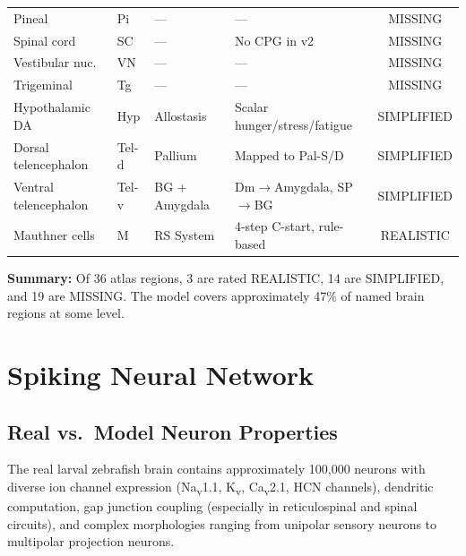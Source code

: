 \documentclass[11pt,a4paper]{article}
\begin{document}
\begin{longtable}{@{}llllc@{}}
Pineal               & Pi   & ---            & ---                              & \textcolor{missing}{MISSING}       \\
Spinal cord          & SC   & ---            & No CPG in v2                     & \textcolor{missing}{MISSING}       \\
Vestibular nuc.      & VN   & ---            & ---                              & \textcolor{missing}{MISSING}       \\
Trigeminal           & Tg   & ---            & ---                              & \textcolor{missing}{MISSING}       \\
Hypothalamic DA      & Hyp  & Allostasis     & Scalar hunger/stress/fatigue     & \textcolor{simplified}{SIMPLIFIED} \\
Dorsal telencephalon & Tel-d & Pallium       & Mapped to Pal-S/D               & \textcolor{simplified}{SIMPLIFIED} \\
Ventral telencephalon & Tel-v & BG + Amygdala & Dm$\to$Amygdala, SP$\to$BG      & \textcolor{simplified}{SIMPLIFIED} \\
Mauthner cells       & M    & RS System      & 4-step C-start, rule-based       & \textcolor{realistic}{REALISTIC}   \\
\bottomrule
\end{longtable}

\noindent\textbf{Summary:} Of 36 atlas regions, 3 are rated \textcolor{realistic}{REALISTIC},
14 are \textcolor{simplified}{SIMPLIFIED}, and 19 are \textcolor{missing}{MISSING}.
The model covers approximately 47\% of named brain regions at some level.

\section{Spiking Neural Network}
\label{sec:snn}

\subsection{Real vs.\ Model Neuron Properties}

The real larval zebrafish brain contains approximately 100,000 neurons with diverse
ion channel expression (Na\textsubscript{v}1.1, K\textsubscript{v}, Ca\textsubscript{v}2.1,
HCN channels), dendritic computation, gap junction coupling (especially in reticulospinal
and spinal circuits), and complex morphologies ranging from unipolar sensory neurons
to multipolar projection neurons.
\end{document}
